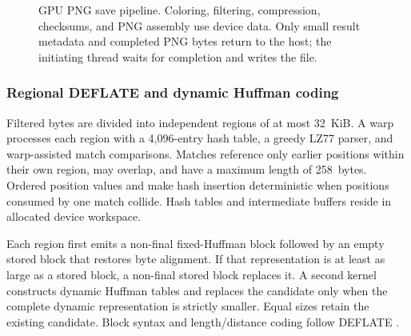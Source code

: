 \begin{figure}[!htbp]
\centering
{}
\caption[GPU PNG save pipeline]{GPU PNG save pipeline. Coloring,
filtering, compression, checksums, and PNG assembly use device data.
Only small result metadata and completed PNG bytes return to the host;
the initiating thread waits for completion and writes the file.}
\label{fig:png-encoder-pipeline}
\end{figure}

\subsubsection{Regional DEFLATE and dynamic Huffman coding}

Filtered bytes are divided into independent regions of at most
32~KiB. A warp processes each region with a 4,096-entry hash table,
a greedy LZ77 parser, and warp-assisted match comparisons. Matches
reference only earlier positions within their own region, may overlap,
and have a maximum length of 258~bytes. Ordered position values and
 make hash insertion deterministic when positions
consumed by one match collide. Hash tables and intermediate buffers
reside in allocated device workspace.

Each region first emits a non-final fixed-Huffman block followed by an
empty stored block that restores byte alignment. If that representation
is at least as large as a stored block, a non-final stored block replaces
it. A second kernel constructs dynamic Huffman tables and replaces the
candidate only when the complete dynamic representation is strictly
smaller. Equal sizes retain the existing candidate. Block syntax and
length/distance coding follow DEFLATE \cite{RFC1951}.


